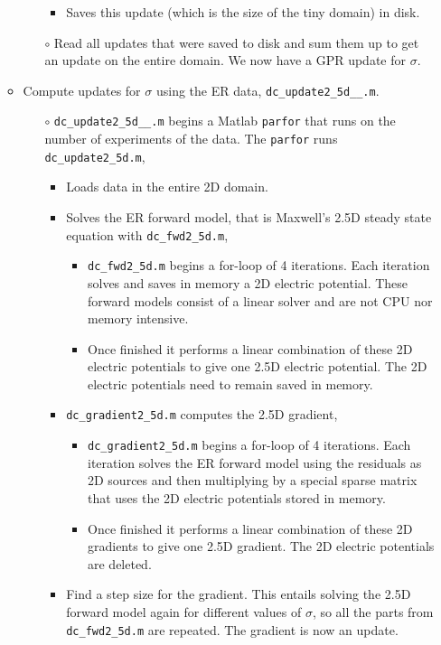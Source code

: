 \documentclass[11pt, oneside]{article}   	%
\begin{document}
\begin{enumerate}
\begin{itemize}
\begin{itemize}
\begin{itemize}
\item Saves this update (which is the size of the tiny domain) in disk.
\end{itemize}
\item[$\circ$] Read all updates that were saved to disk and sum them up to get an update on the entire domain. We now have a GPR update for $\sigma$.
\end{itemize}
\item Compute updates for $\sigma$ using the ER data, {\tt dc\_update2\_5d\_\_.m}.
\begin{itemize}
\item[$\circ$] {\tt dc\_update2\_5d\_\_.m} begins a Matlab {\tt parfor} that runs on the number of experiments of the data. The {\tt parfor} runs {\tt dc\_update2\_5d.m},
\begin{itemize}
\item Loads data in the entire 2D domain.
\item Solves the ER forward model, that is Maxwell's 2.5D steady state equation with {\tt dc\_fwd2\_5d.m},
\begin{itemize}
\item {\tt dc\_fwd2\_5d.m} begins a for-loop of 4 iterations. Each iteration solves and saves in memory a 2D electric potential. These forward models consist of a linear solver and are not CPU nor memory intensive. 
\item Once finished it performs a linear combination of these 2D electric potentials to give one 2.5D electric potential. The 2D electric potentials need to remain saved in memory.
\end{itemize}
\item {\tt dc\_gradient2\_5d.m} computes the 2.5D gradient,
\begin{itemize}
\item {\tt dc\_gradient2\_5d.m} begins a for-loop of 4 iterations. Each iteration solves the ER forward model using the residuals as 2D sources and then multiplying by a special sparse matrix that uses the 2D electric potentials stored in memory.
\item Once finished it performs a linear combination of these 2D gradients to give one 2.5D gradient. The 2D electric potentials are deleted.
\end{itemize}
\item Find a step size for the gradient. This entails solving the 2.5D forward model again for different values of $\sigma$, so all the parts from {\tt dc\_fwd2\_5d.m} are repeated. The gradient is now an update.

\end{itemize}
\end{itemize}
\end{itemize}
\end{enumerate}
\end{document}
